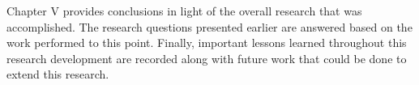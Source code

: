 
Chapter V provides conclusions in light of the overall research that was accomplished. The research questions presented earlier are answered based on the work performed to this point. Finally, important lessons learned throughout this research development are recorded along with future work that could be done to extend this research.